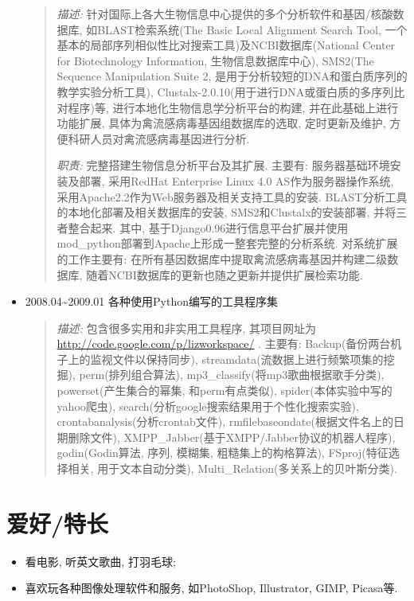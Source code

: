 \documentclass[a4paper,10pt,english]{manual}
\begin{document}
\begin{itemize}
\begin{quote}
\emph{描述:} 针对国际上各大生物信息中心提供的多个分析软件和基因/核酸数据库, 如BLAST检索系统(The Basic Local Alignment Search Tool, 一个基本的局部序列相似性比对搜索工具)及NCBI数据库(National Center for Biotechnology Information, 生物信息数据库中心), SMS2(The Sequence Manipulation Suite 2, 是用于分析较短的DNA和蛋白质序列的教学实验分析工具), Clustalx-2.0.10(用于进行DNA或蛋白质的多序列比对程序)等, 进行本地化生物信息学分析平台的构建, 并在此基础上进行功能扩展, 具体为禽流感病毒基因组数据库的选取, 定时更新及维护, 方便科研人员对禽流感病毒基因进行分析.

\emph{职责:} 完整搭建生物信息分析平台及其扩展. 主要有: 服务器基础环境安装及部署, 采用RedHat Enterprise Linux 4.0 AS作为服务器操作系统, 采用Apache2.2作为Web服务器及相关支持工具的安装. BLAST分析工具的本地化部署及相关数据库的安装, SMS2和Clustalx的安装部署, 并将三者整合起来. 其中, 基于Django0.96进行信息平台扩展并使用mod\_python部署到Apache上形成一整套完整的分析系统. 对系统扩展的工作主要有: 在所有基因数据库中提取禽流感病毒基因并构建二级数据库, 随着NCBI数据库的更新也随之更新并提供扩展检索功能.

\end{quote}

\item {} 
2008.04\textasciitilde{}2009.01 各种使用Python编写的工具程序集
\begin{quote}

\emph{描述:} 包含很多实用和非实用工具程序, 其项目网址为 \href{http://code.google.com/p/lizworkspace/}{http://code.google.com/p/lizworkspace/} . 主要有: Backup(备份两台机子上的监视文件以保持同步), streamdata(流数据上进行频繁项集的挖掘), perm(排列组合算法), mp3\_classify(将mp3歌曲根据歌手分类), powerset(产生集合的幂集, 和perm有点类似), spider(本体实验中写的yahoo爬虫), search(分析google搜索结果用于个性化搜索实验), crontabanalysis(分析crontab文件), rmfilebaseondate(根据文件名上的日期删除文件), XMPP\_Jabber(基于XMPP/Jabber协议的机器人程序), godin(Godin算法, 序列, 模糊集, 粗糙集上的构格算法), FSproj(特征选择相关, 用于文本自动分类), Multi\_Relation(多关系上的贝叶斯分类).

\end{quote}

\end{itemize}


\section{爱好/特长}
\begin{itemize}
\item {} 
看电影, 听英文歌曲, 打羽毛球;

\item {} 
喜欢玩各种图像处理软件和服务, 如PhotoShop, Illustrator, GIMP, Picasa等.

\end{itemize}
\end{document}
